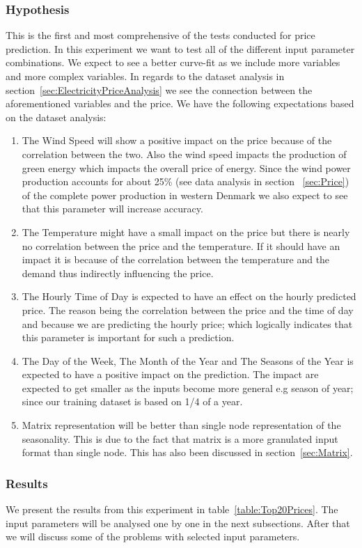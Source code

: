 \subsubsection{Hypothesis}
This is the first and most comprehensive of the tests conducted for price prediction. In this experiment we want to test all of the different input parameter combinations. We expect to see a better curve-fit as we include more variables and more complex variables. In regards to the dataset analysis in section~\ref{sec:ElectricityPriceAnalysis} we see the connection between the aforementioned variables and the price. We have the following expectations based on the dataset analysis:
\begin{enumerate}
	\item The Wind Speed will show a positive impact on the price because of the correlation between the two. Also the wind speed impacts the production of green energy which impacts the overall price of energy. Since the wind power production accounts for about 25\% (see data analysis in section ~\ref{sec:Price}) of the complete power production in western Denmark we also expect to see that this parameter will increase accuracy.
	\item The Temperature might have a small impact on the price but there is nearly no correlation between the price and the temperature. If it should have an impact it is because of the correlation between the temperature and the demand thus indirectly influencing the price.
	\item The Hourly Time of Day is expected to have an effect on the hourly predicted price. The reason being the correlation between the price and the time of day and because we are predicting the hourly price; which logically indicates that this parameter is important for such a prediction. 
	\item The Day of the Week, The Month of the Year and The Seasons of the Year is expected to have a positive impact on the prediction. The impact are expected to get smaller as the inputs become more general e.g season of year; since our training dataset is based on 1/4 of a year. 
	\item Matrix representation will be better than single node representation of the seasonality. This is due to the fact that matrix is a more granulated input format than single node. This has also been discussed in section~\ref{sec:Matrix}.
\end{enumerate}

\subsubsection{Results}
We present the results from this experiment in table~\ref{table:Top20Prices}. The input parameters will be analysed one by one in the next subsections. After that we will discuss some of the problems with selected input parameters.


